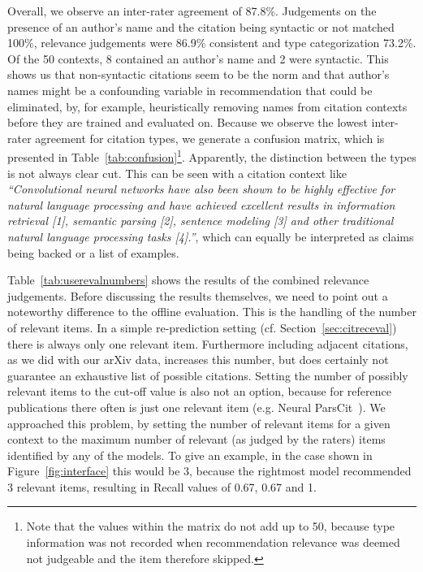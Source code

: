 Overall, we observe an inter-rater agreement of 87.8\%. Judgements on the presence of an author's name and the citation being syntactic or not matched 100\%, relevance judgements were 86.9\% consistent and type categorization 73.2\%. Of the 50 contexts, 8 contained an author's name and 2 were syntactic. This shows us that non-syntactic citations seem to be the norm and that author's names might be a confounding variable in recommendation that could be eliminated, by, for example, heuristically removing names from citation contexts before they are trained and evaluated on. Because we observe the lowest inter-rater agreement for citation types, we generate a confusion matrix, which is presented in Table~\ref{tab:confusion}\footnote{Note that the values within the matrix do not add up to 50, because type information was not recorded when recommendation relevance was deemed not judgeable and the item therefore skipped.}. Apparently, the distinction between the types is not always clear cut. This can be seen with a citation context like \emph{``Convolutional neural networks have also been shown to be highly effective for natural language processing and have achieved excellent results in information retrieval [1], semantic parsing [2], sentence modeling [3] and other traditional natural language processing tasks [4].''}, which can equally be interpreted as claims being backed or a list of examples.

Table~\ref{tab:userevalnumbers} shows the results of the combined relevance judgements. Before discussing the results themselves, we need to point out a noteworthy difference to the offline evaluation. This is the handling of the number of relevant items. In a simple re-prediction setting (cf. Section~\ref{sec:citreceval}) there is always only one relevant item. Furthermore including adjacent citations, as we did with our arXiv data, increases this number, but does certainly not guarantee an exhaustive list of possible citations. Setting the number of possibly relevant items to the cut-off value is also not an option, because for reference publications there often is just one relevant item (e.g. Neural ParsCit~\cite{Animesh2018}). We approached this problem, by setting the number of relevant items for a given context to the maximum number of relevant (as judged by the raters) items identified by any of the models. To give an example, in the case shown in Figure~\ref{fig:interface} this would be 3, because the rightmost model recommended 3 relevant items, resulting in Recall values of 0.67, 0.67 and 1.

